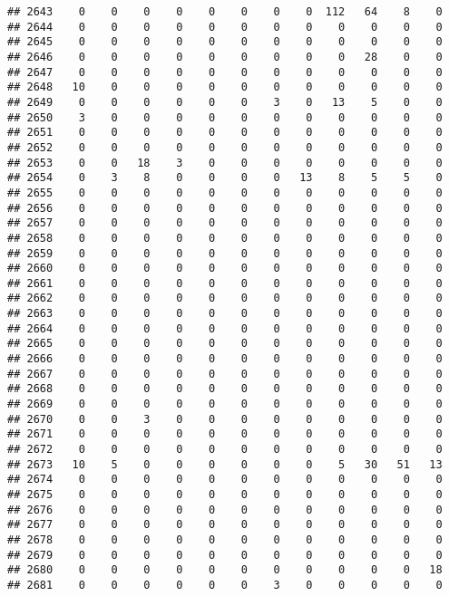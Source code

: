 \documentclass[]{article}
\begin{document}
\begin{verbatim}
## 2643    0    0    0    0    0    0    0    0  112   64    8    0
## 2644    0    0    0    0    0    0    0    0    0    0    0    0
## 2645    0    0    0    0    0    0    0    0    0    0    0    0
## 2646    0    0    0    0    0    0    0    0    0   28    0    0
## 2647    0    0    0    0    0    0    0    0    0    0    0    0
## 2648   10    0    0    0    0    0    0    0    0    0    0    0
## 2649    0    0    0    0    0    0    3    0   13    5    0    0
## 2650    3    0    0    0    0    0    0    0    0    0    0    0
## 2651    0    0    0    0    0    0    0    0    0    0    0    0
## 2652    0    0    0    0    0    0    0    0    0    0    0    0
## 2653    0    0   18    3    0    0    0    0    0    0    0    0
## 2654    0    3    8    0    0    0    0   13    8    5    5    0
## 2655    0    0    0    0    0    0    0    0    0    0    0    0
## 2656    0    0    0    0    0    0    0    0    0    0    0    0
## 2657    0    0    0    0    0    0    0    0    0    0    0    0
## 2658    0    0    0    0    0    0    0    0    0    0    0    0
## 2659    0    0    0    0    0    0    0    0    0    0    0    0
## 2660    0    0    0    0    0    0    0    0    0    0    0    0
## 2661    0    0    0    0    0    0    0    0    0    0    0    0
## 2662    0    0    0    0    0    0    0    0    0    0    0    0
## 2663    0    0    0    0    0    0    0    0    0    0    0    0
## 2664    0    0    0    0    0    0    0    0    0    0    0    0
## 2665    0    0    0    0    0    0    0    0    0    0    0    0
## 2666    0    0    0    0    0    0    0    0    0    0    0    0
## 2667    0    0    0    0    0    0    0    0    0    0    0    0
## 2668    0    0    0    0    0    0    0    0    0    0    0    0
## 2669    0    0    0    0    0    0    0    0    0    0    0    0
## 2670    0    0    3    0    0    0    0    0    0    0    0    0
## 2671    0    0    0    0    0    0    0    0    0    0    0    0
## 2672    0    0    0    0    0    0    0    0    0    0    0    0
## 2673   10    5    0    0    0    0    0    0    5   30   51   13
## 2674    0    0    0    0    0    0    0    0    0    0    0    0
## 2675    0    0    0    0    0    0    0    0    0    0    0    0
## 2676    0    0    0    0    0    0    0    0    0    0    0    0
## 2677    0    0    0    0    0    0    0    0    0    0    0    0
## 2678    0    0    0    0    0    0    0    0    0    0    0    0
## 2679    0    0    0    0    0    0    0    0    0    0    0    0
## 2680    0    0    0    0    0    0    0    0    0    0    0   18
## 2681    0    0    0    0    0    0    3    0    0    0    0    0

\end{verbatim}
\end{document}
